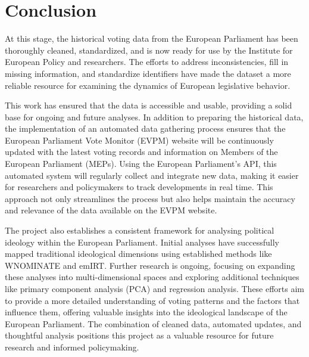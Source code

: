 \documentclass{article}
\begin{document}
    \section{Conclusion}
    At this stage, the historical voting data from the European Parliament has been thoroughly cleaned, standardized,
    and is now ready for use by the Institute for European Policy and researchers. The efforts to address
    inconsistencies, fill in missing information, and standardize identifiers have made the dataset a more reliable
    resource for examining the dynamics of European legislative behavior.

    This work has ensured that the data is accessible and usable, providing a solid base for ongoing and future analyses.
    In addition to preparing the historical data, the implementation of an automated data gathering process ensures that
    the European Parliament Vote Monitor (EVPM) website will be continuously updated with the latest voting records and
    information on Members of the European Parliament (MEPs). Using the European Parliament’s API, this
    automated system will regularly collect and integrate new data, making it easier for researchers and policymakers to
    track developments in real time. This approach not only streamlines the process but also helps maintain the accuracy
    and relevance of the data available on the EVPM website.

    The project also establishes a consistent framework for analysing political ideology within the European Parliament.
    Initial analyses have successfully mapped traditional ideological dimensions using established methods like
    WNOMINATE and emIRT. Further research is ongoing, focusing on expanding these analyses into multi-dimensional spaces
    and exploring additional techniques like primary component analysis (PCA) and regression analysis. These efforts aim
    to provide a more detailed understanding of voting patterns and the factors that influence them, offering valuable
    insights into the ideological landscape of the European Parliament. The combination of cleaned data, automated
    updates, and thoughtful analysis positions this project as a valuable resource for future research and informed
    policymaking.
\end{document}

